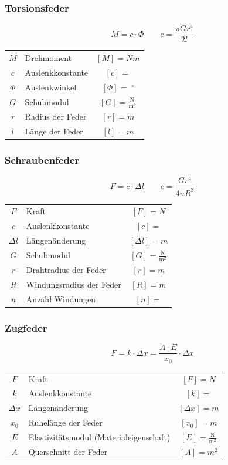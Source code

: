 		\subsubsection{Torsionsfeder}
		
			$$ \boxed{ M = c \cdot \varPhi \quad \quad c = \frac{\pi G r^4}{2l} }$$ 

			\begin{tabular}{c l c}
				$M$ & Drehmoment & $[M] = Nm$ \\
				$c$ & Auslenkkonstante & $[c] = $ \\
				$\varPhi$ & Auslenkwinkel & $[\varPhi] = \; ^\circ $ \\
				$G$ & Schubmodul & $[G] = \mathrm{\frac{N}{m^2}}$ \\
				$r$ & Radius der Feder & $[r] = m$ \\
				$l$ & Länge der Feder & $[l] = m$ \\
			\end{tabular}

		\subsubsection{Schraubenfeder}
		
			$$ \boxed{ F = c \cdot \Delta l \quad \quad c = \frac{G r^4}{4nR^3} }$$ 

			\begin{tabular}{c l c}
				$F$ & Kraft & $[F] = N$ \\
				$c$ & Auslenkkonstante & $[c] = $ \\
				$\Delta l$ & Längenänderung & $[\Delta l] = m$ \\
				$G$ & Schubmodul & $[G] = \mathrm{\frac{N}{m^2}}$ \\
				$r$ & Drahtradius der Feder & $[r] = m$ \\
				$R$ & Windungsradius der Feder & $[R] = m$ \\
				$n$ & Anzahl Windungen & $[n] = $ \\
			\end{tabular}

		\subsubsection{Zugfeder}
		
			$$ \boxed{ F = k \cdot \Delta x = \frac{A \cdot E}{x_0} \cdot \Delta x }$$ 

			\begin{tabular}{c l c}
				$F$ & Kraft & $[F] = N$ \\
				$k$ & Auslenkkonstante & $[k] = $ \\
				$\Delta x$ & Längenänderung & $[\Delta x] = m$ \\
				$x_0$ & Ruhelänge der Feder & $[x_0] = m$ \\
				\rule{0pt}{10pt}$E$ & Elastizitätsmodul (Materialeigenschaft) & $[E] = \mathrm{\frac{N}{m^2}}$ \\
				$A$ & Querschnitt der Feder & $[A] = m^2$ \\
			\end{tabular}

